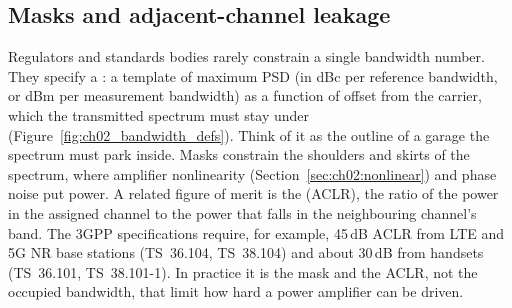 \subsection{Masks and adjacent-channel leakage}

Regulators and standards bodies rarely constrain a single bandwidth number. They specify a
: a template of maximum PSD (in dBc per reference bandwidth, or dBm per
measurement bandwidth) as a function of offset from the carrier, which the transmitted spectrum
must stay under (Figure~\ref{fig:ch02_bandwidth_defs}). Think of it as the outline of a garage the
spectrum must park inside. Masks constrain the shoulders and skirts of the spectrum, where amplifier
nonlinearity (Section~\ref{sec:ch02:nonlinear}) and phase noise put power. A related figure of merit
is the  (ACLR), the ratio of the power in the assigned channel to
the power that falls in the neighbouring channel's band. The 3GPP specifications require, for
example, 45\,dB ACLR from LTE and 5G NR base stations (TS~36.104, TS~38.104) and about 30\,dB from
handsets (TS~36.101, TS~38.101-1). In practice it is the mask and the ACLR, not the occupied
bandwidth, that limit how hard a power amplifier can be driven.


